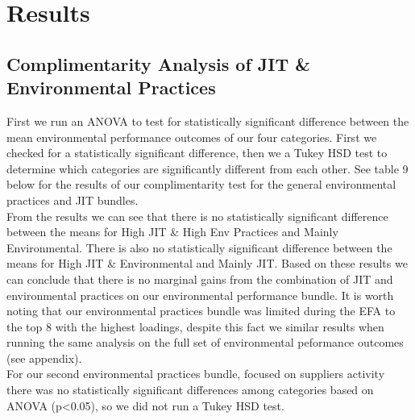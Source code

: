 \section{Results}
\subsection*{Complimentarity Analysis of JIT \& Environmental Practices}
First we run an ANOVA to test for statistically significant difference between the mean environmental performance outcomes of our four categories. 
First we checked for a statistically significant difference, then we a Tukey HSD test to determine which categories are significantly different from each other. 
See table 9 below for the results of our complimentarity test for the general environmental practices and JIT bundles.
 \\ 
From the results we can see that there is no statistically significant difference between the means for High JIT \& High Env Practices and Mainly Environmental.
There is also no statistically significant difference between the means for High JIT \& Environmental and Mainly JIT.
Based on these results we can conclude that there is no marginal gains from the combination of JIT and environmental practices on our environmental performance bundle.
It is worth noting that our environmental practices bundle was limited during the EFA to the top 8 with the highest loadings, despite this fact we similar results when running the same analysis on the full set of environmental peformance outcomes (see appendix). 
\\
For our second environmental practices bundle, focused on suppliers activity there was no statistically significant differences among categories based on ANOVA (p<0.05), so we did not run a Tukey HSD test.
